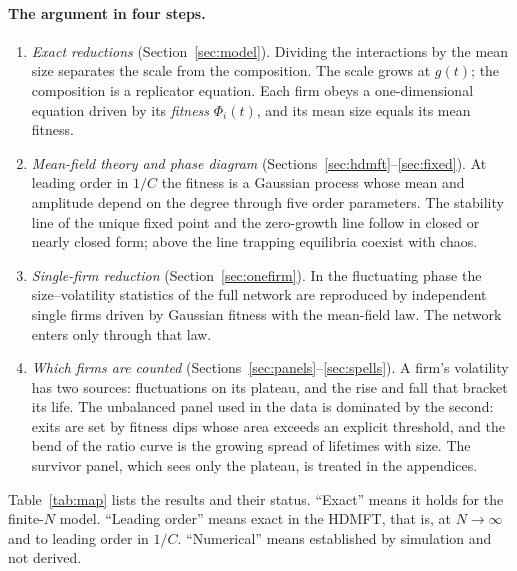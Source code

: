\documentclass[11pt]{article}
\begin{document}
\paragraph{The argument in four steps.}
\begin{enumerate}
  \item \emph{Exact reductions} (Section~\ref{sec:model}).  Dividing the interactions by the mean
        size separates the scale from the composition.  The scale grows at $g(t)$; the
        composition is a replicator equation.  Each firm obeys a one-dimensional equation driven
        by its \emph{fitness} $\Phi_i(t)$, and its mean size equals its mean fitness.
  \item \emph{Mean-field theory and phase diagram} (Sections~\ref{sec:hdmft}--\ref{sec:fixed}).  At
        leading order in $1/C$ the fitness is a Gaussian process whose mean and amplitude depend
        on the degree through five order parameters.  The stability line of the unique fixed
        point and the zero-growth line follow in closed or nearly closed form; above the line
        trapping equilibria coexist with chaos.
  \item \emph{Single-firm reduction} (Section~\ref{sec:onefirm}).  In the fluctuating phase the
        size--volatility statistics of the full network are reproduced by independent single
        firms driven by Gaussian fitness with the mean-field law.  The network enters only
        through that law.
  \item \emph{Which firms are counted} (Sections~\ref{sec:panels}--\ref{sec:spells}).  A
        firm's volatility has two sources: fluctuations on its plateau, and the rise and fall
        that bracket its life.  The unbalanced panel used in the data is dominated by the second:
        exits are set by fitness dips whose area exceeds an explicit threshold, and the bend of
        the ratio curve is the growing spread of lifetimes with size.  The survivor panel, which
        sees only the plateau, is treated in the appendices.
\end{enumerate}
Table~\ref{tab:map} lists the results and their status.  ``Exact'' means it holds for the
finite-$N$ model.  ``Leading order'' means exact in the HDMFT, that is, at $N\to\infty$ and to
leading order in $1/C$.  ``Numerical'' means established by simulation and not derived.
\end{document}
